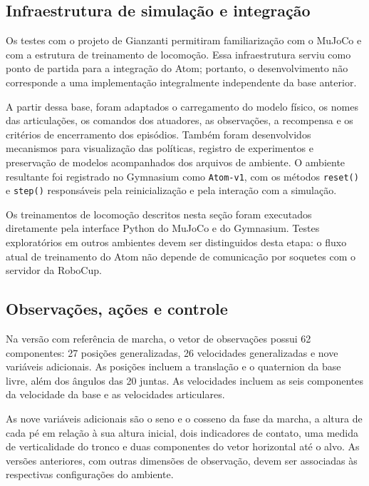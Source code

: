 \subsection{Infraestrutura de simulação e integração}

Os testes com o projeto de Gianzanti \cite{gianzanti2022} permitiram familiarização com o MuJoCo e com a estrutura de treinamento de locomoção. Essa infraestrutura serviu como ponto de partida para a integração do Atom; portanto, o desenvolvimento não corresponde a uma implementação integralmente independente da base anterior.

A partir dessa base, foram adaptados o carregamento do modelo físico, os nomes das articulações, os comandos dos atuadores, as observações, a recompensa e os critérios de encerramento dos episódios. Também foram desenvolvidos mecanismos para visualização das políticas, registro de experimentos e preservação de modelos acompanhados dos arquivos de ambiente. O ambiente resultante foi registrado no Gymnasium como \texttt{Atom-v1}, com os métodos \texttt{reset()} e \texttt{step()} responsáveis pela reinicialização e pela interação com a simulação.

Os treinamentos de locomoção descritos nesta seção foram executados diretamente pela interface Python do MuJoCo e do Gymnasium. Testes exploratórios em outros ambientes devem ser distinguidos desta etapa: o fluxo atual de treinamento do Atom não depende de comunicação por soquetes com o servidor da RoboCup.

\subsection{Observações, ações e controle}

Na versão com referência de marcha, o vetor de observações possui 62 componentes: 27 posições generalizadas, 26 velocidades generalizadas e nove variáveis adicionais. As posições incluem a translação e o quaternion da base livre, além dos ângulos das 20 juntas. As velocidades incluem as seis componentes da velocidade da base e as velocidades articulares.

As nove variáveis adicionais são o seno e o cosseno da fase da marcha, a altura de cada pé em relação à sua altura inicial, dois indicadores de contato, uma medida de verticalidade do tronco e duas componentes do vetor horizontal até o alvo. As versões anteriores, com outras dimensões de observação, devem ser associadas às respectivas configurações do ambiente.

